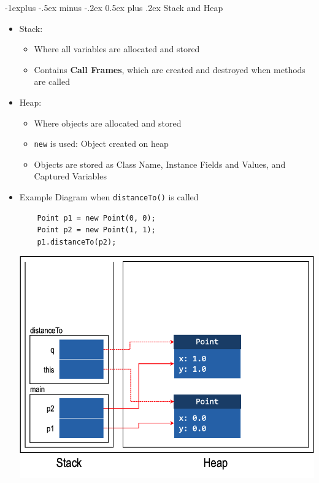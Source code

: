 \documentclass[10pt, landscape]{article}
\makeatletter
\renewcommand{\section}{\@startsection{section}{1}{0mm}%
                                {-1ex plus -.5ex minus -.2ex}%
                                {0.5ex plus .2ex}%
                                {\normalfont\large\bfseries}}
\renewcommand{\section}{\@startsection{section}{2}{0mm}%
                                {-1explus -.5ex minus -.2ex}%
                                {0.5ex plus .2ex}%
                                {\normalfont\normalsize\bfseries}}
\makeatother
\begin{document}
\begin{multicols*}{4}
\section{Stack and Heap}
\begin{itemize}
    \item Stack:
        \begin{itemize}
            \item Where all variables are allocated and stored
            \item Contains \textbf{Call Frames}, which are created and destroyed when methods are called
        \end{itemize}
    \item Heap:
        \begin{itemize}
            \item Where objects are allocated and stored
            \item \lstinline{new} is used: Object created on heap
            \item Objects are stored as Class Name, Instance Fields and Values, and Captured Variables
        \end{itemize}
    \item Example Diagram when \verb|distanceTo()| is called
    \begin{lstlisting}
    Point p1 = new Point(0, 0);
    Point p2 = new Point(1, 1);
    p1.distanceTo(p2);
    \end{lstlisting}
    \includegraphics[width=\linewidth]{006b.png}
\end{itemize}


\end{multicols*}
\end{document}
